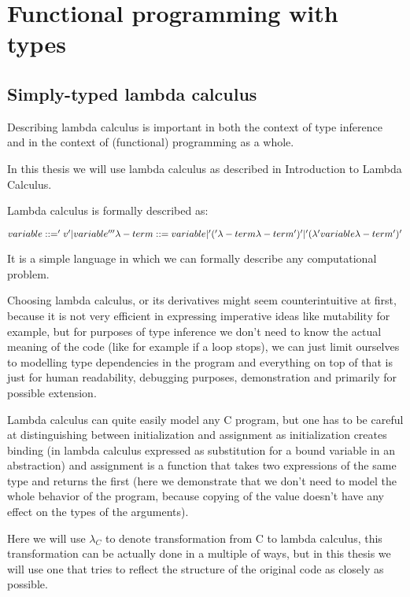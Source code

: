 \chapter{Functional programming with types}


\section{Simply-typed lambda calculus}

Describing lambda calculus is important in both the context of type inference and in the context of (functional)
programming as a whole.

In this thesis we will use lambda calculus as described in Introduction to Lambda Calculus.  %

Lambda calculus is formally described as:

$
    variable ::= 'v' | variable ''' \\
    \lambda-term ::= variable | '(' \lambda-term \lambda-term ')' |  '(\lambda' variable \lambda-term ')'
$

It is a simple language in which we can formally describe any computational problem.

Choosing lambda calculus, or its derivatives might seem counterintuitive at first, because it
is not very efficient in expressing imperative ideas like mutability for example, but for
purposes of type inference we don't need to know the actual meaning of the code (like for example
if a loop stops), we can just limit ourselves to modelling type dependencies in the program and
everything on top of that is just for human readability, debugging purposes, demonstration and
primarily for possible extension.

Lambda calculus can quite easily model any C program, but one has to be careful at distinguishing
between initialization and assignment as initialization creates binding (in lambda calculus expressed
as substitution for a bound variable in an abstraction) and assignment is a function that takes two
expressions of the same type and returns the first (here we demonstrate that we don't need to
model the whole behavior of the program, because copying of the value doesn't have any effect on
the types of the arguments).

Here we will use $\lambda_C$ to denote transformation from C to lambda calculus,
this transformation can be actually done in a multiple of ways, but in this thesis we will use one that tries to
reflect the structure of the original code as closely as possible.

